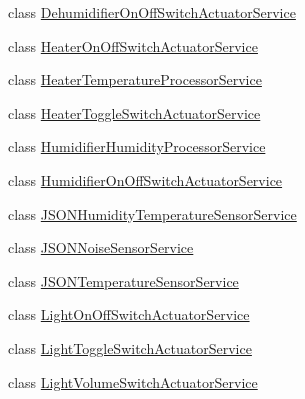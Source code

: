 \begin{DoxyCompactItemize}
class \hyperlink{classjp_1_1ac_1_1kyoto__u_1_1i_1_1soc_1_1ai_1_1iostbase_1_1service_1_1iot_1_1_dehumidifier_on_off_switch_actuator_service}{Dehumidifier\-On\-Off\-Switch\-Actuator\-Service}
\item 
class \hyperlink{classjp_1_1ac_1_1kyoto__u_1_1i_1_1soc_1_1ai_1_1iostbase_1_1service_1_1iot_1_1_heater_on_off_switch_actuator_service}{Heater\-On\-Off\-Switch\-Actuator\-Service}
\item 
class \hyperlink{classjp_1_1ac_1_1kyoto__u_1_1i_1_1soc_1_1ai_1_1iostbase_1_1service_1_1iot_1_1_heater_temperature_processor_service}{Heater\-Temperature\-Processor\-Service}
\item 
class \hyperlink{classjp_1_1ac_1_1kyoto__u_1_1i_1_1soc_1_1ai_1_1iostbase_1_1service_1_1iot_1_1_heater_toggle_switch_actuator_service}{Heater\-Toggle\-Switch\-Actuator\-Service}
\item 
class \hyperlink{classjp_1_1ac_1_1kyoto__u_1_1i_1_1soc_1_1ai_1_1iostbase_1_1service_1_1iot_1_1_humidifier_humidity_processor_service}{Humidifier\-Humidity\-Processor\-Service}
\item 
class \hyperlink{classjp_1_1ac_1_1kyoto__u_1_1i_1_1soc_1_1ai_1_1iostbase_1_1service_1_1iot_1_1_humidifier_on_off_switch_actuator_service}{Humidifier\-On\-Off\-Switch\-Actuator\-Service}
\item 
class \hyperlink{classjp_1_1ac_1_1kyoto__u_1_1i_1_1soc_1_1ai_1_1iostbase_1_1service_1_1iot_1_1_j_s_o_n_humidity_temperature_sensor_service}{J\-S\-O\-N\-Humidity\-Temperature\-Sensor\-Service}
\item 
class \hyperlink{classjp_1_1ac_1_1kyoto__u_1_1i_1_1soc_1_1ai_1_1iostbase_1_1service_1_1iot_1_1_j_s_o_n_noise_sensor_service}{J\-S\-O\-N\-Noise\-Sensor\-Service}
\item 
class \hyperlink{classjp_1_1ac_1_1kyoto__u_1_1i_1_1soc_1_1ai_1_1iostbase_1_1service_1_1iot_1_1_j_s_o_n_temperature_sensor_service}{J\-S\-O\-N\-Temperature\-Sensor\-Service}
\item 
class \hyperlink{classjp_1_1ac_1_1kyoto__u_1_1i_1_1soc_1_1ai_1_1iostbase_1_1service_1_1iot_1_1_light_on_off_switch_actuator_service}{Light\-On\-Off\-Switch\-Actuator\-Service}
\item 
class \hyperlink{classjp_1_1ac_1_1kyoto__u_1_1i_1_1soc_1_1ai_1_1iostbase_1_1service_1_1iot_1_1_light_toggle_switch_actuator_service}{Light\-Toggle\-Switch\-Actuator\-Service}
\item 
class \hyperlink{classjp_1_1ac_1_1kyoto__u_1_1i_1_1soc_1_1ai_1_1iostbase_1_1service_1_1iot_1_1_light_volume_switch_actuator_service}{Light\-Volume\-Switch\-Actuator\-Service}

\end{DoxyCompactItemize}
